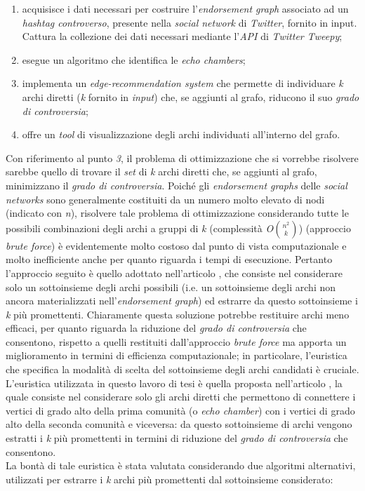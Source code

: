 \documentclass[trieste,12pt]{toptesi}
\begin{document}
\begin{enumerate}
\item acquisisce i dati necessari per costruire l'\textit{endorsement graph} associato ad un \textit{hashtag controverso}, presente nella \textit{social network} di \textit{Twitter}, fornito in input. Cattura la collezione dei dati necessari mediante l'\textit{API} di \textit{Twitter Tweepy};
\item esegue un algoritmo che identifica le \textit{echo chambers};
\item implementa un \textit{edge-recommendation system} che permette di individuare \textit{k} archi diretti (\textit{k} fornito in \textit{input}) che, se aggiunti al grafo, riducono il suo \textit{grado di controversia};
\item offre un \textit{tool} di visualizzazione degli archi individuati all'interno del grafo.
\end{enumerate}
Con riferimento al punto \textit{3}, il problema di ottimizzazione che si vorrebbe risolvere sarebbe quello di trovare il \textit{set} di \textit{k} archi diretti che, se aggiunti al grafo, minimizzano il \textit{grado di controversia}.
Poiché gli \textit{endorsement graphs} delle \textit{social networks} sono generalmente costituiti da un numero molto elevato di nodi (indicato con \textit{n}), risolvere tale problema di ottimizzazione considerando tutte le possibili combinazioni degli archi a gruppi di \textit{k} (complessità \textit{O}${n^2\choose k}$) (approccio \textit{brute force}) è evidentemente molto costoso dal punto di vista computazionale e molto inefficiente anche per quanto riguarda i tempi di esecuzione. Pertanto l'approccio seguito è quello adottato nell'articolo \cite{garimella:paper}, che consiste nel considerare solo un sottoinsieme degli archi possibili (i.e. un sottoinsieme degli archi non ancora materializzati nell'\textit{endorsement graph}) ed estrarre da questo sottoinsieme i \textit{k} più promettenti. Chiaramente questa soluzione potrebbe restituire archi meno efficaci, per quanto riguarda la riduzione del \textit{grado di controversia} che consentono, rispetto a quelli restituiti dall'approccio \textit{brute force} ma apporta un miglioramento in termini di efficienza computazionale; in particolare, l'euristica che specifica la modalità di scelta del sottoinsieme degli archi candidati è cruciale. L'euristica utilizzata in questo lavoro di tesi è quella proposta nell'articolo \cite{garimella:paper}, la quale
consiste nel considerare solo gli archi diretti che permettono di connettere i vertici di grado alto della prima comunità (o \textit{echo chamber}) con i vertici di grado alto della seconda comunità e viceversa: da questo sottoinsieme di archi vengono estratti i \textit{k} più promettenti in termini di riduzione del \textit{grado di controversia} che consentono.\\La bontà di tale euristica è stata valutata considerando due algoritmi alternativi, utilizzati per estrarre i \textit{k} archi più promettenti dal sottoinsieme considerato: 
\end{document}
